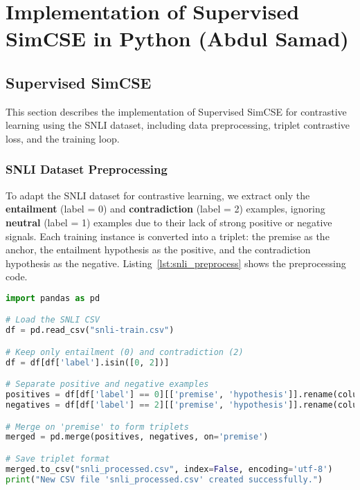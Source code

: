 
\chapter{Implementation of Supervised SimCSE in Python (Abdul Samad)}
\label{AppendixB}

\section{Supervised SimCSE}
This section describes the implementation of Supervised SimCSE for contrastive learning using the SNLI dataset, including data preprocessing, triplet contrastive loss, and the training loop.

\subsection{SNLI Dataset Preprocessing}
To adapt the SNLI dataset for contrastive learning, we extract only the \textbf{entailment} (label = 0) and \textbf{contradiction} (label = 2) examples, ignoring \textbf{neutral} (label = 1) examples due to their lack of strong positive or negative signals. Each training instance is converted into a triplet: the premise as the anchor, the entailment hypothesis as the positive, and the contradiction hypothesis as the negative. Listing~\ref{lst:snli_preprocess} shows the preprocessing code.

\begin{lstlisting}[language=Python, caption={Preprocessing SNLI Dataset}, label={lst:snli_preprocess}, basicstyle=\ttfamily\small, keywordstyle=\color{blue}, commentstyle=\color{green}, stringstyle=\color{red},linewidth=\textwidth]
import pandas as pd

# Load the SNLI CSV
df = pd.read_csv("snli-train.csv")

# Keep only entailment (0) and contradiction (2)
df = df[df['label'].isin([0, 2])]

# Separate positive and negative examples
positives = df[df['label'] == 0][['premise', 'hypothesis']].rename(columns={'hypothesis': 'positive_sentence'})
negatives = df[df['label'] == 2][['premise', 'hypothesis']].rename(columns={'hypothesis': 'negative_sentence'})

# Merge on 'premise' to form triplets
merged = pd.merge(positives, negatives, on='premise')

# Save triplet format
merged.to_csv("snli_processed.csv", index=False, encoding='utf-8')
print("New CSV file 'snli_processed.csv' created successfully.")
\end{lstlisting}

